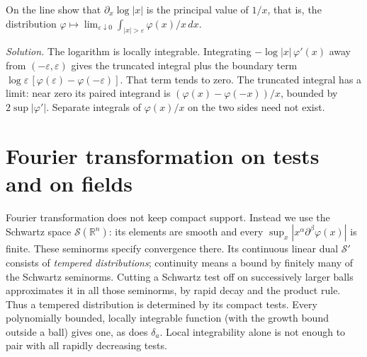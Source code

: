 \begin{exercise}
On the line show that $\partial_x\log|x|$ is the principal value of $1/x$, that is, the distribution $\varphi\mapsto\lim_{\varepsilon\downarrow0}\int_{|x|>\varepsilon}\varphi(x)/x\,dx$.
\end{exercise}
\noindent\emph{Solution.} The logarithm is locally integrable. Integrating $-\log|x|\,\varphi'(x)$ away from $(-\varepsilon,\varepsilon)$ gives the truncated integral plus the boundary term $\log\varepsilon\,[\varphi(\varepsilon)-\varphi(-\varepsilon)]$. That term tends to zero. The truncated integral has a limit: near zero its paired integrand is $(\varphi(x)-\varphi(-x))/x$, bounded by $2\sup|\varphi'|$. Separate integrals of $\varphi(x)/x$ on the two sides need not exist.

\section{Fourier transformation on tests and on fields}\label{f:fourier-convention}

Fourier transformation does not keep compact support. Instead we use the Schwartz space $\mathcal S(\mathbb R^n)$: its elements are smooth and every $\sup_x|x^\alpha\partial^\beta\varphi(x)|$ is finite. These seminorms specify convergence there. Its continuous linear dual $\mathcal S'$ consists of \emph{tempered distributions}; continuity means a bound by finitely many of the Schwartz seminorms. Cutting a Schwartz test off on successively larger balls approximates it in all those seminorms, by rapid decay and the product rule. Thus a tempered distribution is determined by its compact tests. Every polynomially bounded, locally integrable function (with the growth bound outside a ball) gives one, as does $\delta_a$. Local integrability alone is not enough to pair with all rapidly decreasing tests.


